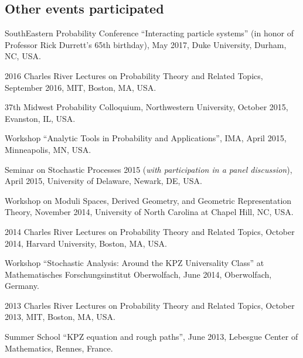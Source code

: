 \documentclass[letterpaper,11pt]{article}
\begin{document}
\subsection*{Other events participated}

\begin{etaremune}
\item 
	SouthEastern Probability Conference
	``Interacting particle systems''
	(in honor of Professor Rick Durrett's 65th birthday),
	May 2017, 
	Duke University, Durham, NC, USA.
	
\item 
	2016 Charles River Lectures on Probability Theory and Related Topics, 
	September 2016, MIT, Boston, MA, USA.


\item 37th Midwest Probability Colloquium, Northwestern University, 
October 2015,
Evanston, IL, USA.

\item Workshop ``Analytic Tools in Probability and Applications'', IMA, April 2015, Minneapolis, MN, USA.

\item Seminar on Stochastic Processes 2015 (\emph{with participation in a panel discussion}), 
April 2015, University of Delaware, 
Newark, DE, USA.

\item Workshop on Moduli Spaces, Derived Geometry, and Geometric Representation Theory, November 2014, University of North Carolina at Chapel Hill, NC, USA.

\item 2014 Charles River Lectures on Probability Theory and Related Topics, 
October 2014, Harvard University, Boston, MA, USA.

\item Workshop ``Stochastic Analysis: Around the KPZ Universality Class'' at Mathematisches Forschungsinstitut Oberwolfach,
June 2014, Oberwolfach, Germany.

\item 2013 Charles River Lectures on Probability Theory and Related Topics, 
October 2013, MIT, Boston, MA, USA.

\item Summer School ``KPZ equation and rough paths'', 
June 2013, 
Lebesgue Center of Mathematics, Rennes, France.


\end{etaremune}
\end{document}
